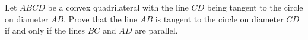 Let $ABCD$ be a convex quadrilateral with the line $CD$ being tangent to the circle on diameter $AB$. Prove that the line $AB$ is tangent to the circle on diameter $CD$ if and only if the lines $BC$ and $AD$ are parallel.